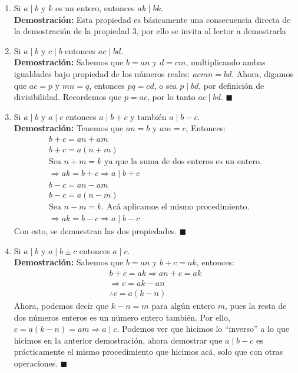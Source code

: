 \documentclass[letterpaper, 13pt]{article}
\begin{document}
\begin{enumerate}
	\item Si $a \mid b$ y $k$ es un entero, entonces $ak \mid bk$.
	\\
	\textbf{Demostración:} Esta propiedad es básicamente una consecuencia directa de la demostración de la propiedad 3, por ello se invita al lector a demostrarla\\
	\item Si $a \mid b$ y $c \mid b$ entonces $ac \mid bd$.
	\\
	\textbf{Demostración:} Sabemos que $b=an$ y $d=cm$, multiplicando ambas igualdades bajo propiedad de los números reales: $acmn=bd$. Ahora, digamos que $ac=p$ y $mn=q$, entonces $pq=cd$, o sea $p \mid bd$, por definición de divisibilidad. Recordemos que $p=ac$, por lo tanto $ac \mid bd$. $\blacksquare$\\
	\item Si $a \mid b$ y $a \mid c$ entonces $a \mid b + c$ y también $a \mid b -c$.
	\\
	\textbf{Demostración:} Tenemos que $an=b$ y $am=c$, Entonces: \begin{gather*}
		b+c=an+am \\ b+c=a(n+m) \\ \text{Sea $n+m=k$ ya que la suma de dos enteros es un entero.} \\
		\Rightarrow ak=b+c \Rightarrow \boxed{ a\mid b+c} \\
		b-c=an-am \\
		b-c=a(n-m) \\ 
		\text{Sea $n-m=k$. Acá aplicamos el mismo procedimiento.} \\ 
		\Rightarrow ak=b-c \Rightarrow \boxed{a \mid b-c}
	\end{gather*}
	Con esto, se demuestran las dos propiedades. $\blacksquare$\\
	\item Si $a \mid b$ y $a \mid b\pm c$ entonces $a \mid c$.
	\\
	\textbf{Demostración:} Sabemos que $b=an$ y $b+c=ak$, entonces: \begin{gather*}
		b+c=ak \Rightarrow an+c=ak \\ 
		\Rightarrow c=ak-an \\ 
		\therefore c=a(k-n)
	\end{gather*}
	Ahora, podemos decir que $k-n=m$ para algún entero $m$, pues la resta de dos números enteros es un número entero también. Por ello, $c=a(k-n)=am \Rightarrow  a\mid c$. Podemos ver que hicimos lo ``inverso'' a lo que hicimos en la anterior demostración, ahora demostrar que $a \mid b-c$ es prácticamente el mismo procedimiento que hicimos acá, solo que con otras operaciones. $\blacksquare$ 
\end{enumerate}
\end{document}
